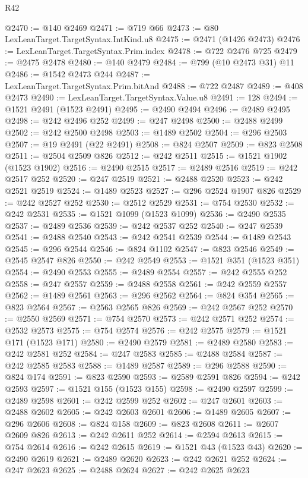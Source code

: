 \begin{lexlean}{R42}
\begin{coremodule}
{@2470 := @140 @2469
@2471 := @719 @66
@2473 := @80 LexLeanTarget.TargetSyntax.IntKind.u8
@2475 := @2471 (@1426 @2473)
@2476 := LexLeanTarget.TargetSyntax.Prim.index
@2478 := @722 @2476 @725
@2479 := @2475 @2478
@2480 := @140 @2479
@2484 := @799 (@10 @2473 @31) @11
@2486 := @1542 @2473 @244
@2487 := LexLeanTarget.TargetSyntax.Prim.bitAnd
@2488 := @722 @2487
@2489 := @408 @2473
@2490 := LexLeanTarget.TargetSyntax.Value.u8
@2491 := 128
@2494 := @1521 @2491 (@1523 @2491)
@2495 := @2490 @2494
@2496 := @2489 @2495
@2498 := @242 @2496 @252
@2499 := @247 @2498
@2500 := @2488 @2499
@2502 := @242 @2500 @2498
@2503 := @1489 @2502
@2504 := @296 @2503
@2507 := @19 @2491 (@22 @2491)
@2508 := @824 @2507
@2509 := @823 @2508
@2511 := @2504 @2509 @826
@2512 := @242 @2511
@2515 := @1521 @1902 (@1523 @1902)
@2516 := @2490 @2515
@2517 := @2489 @2516
@2519 := @242 @2517 @252
@2520 := @247 @2519
@2521 := @2488 @2520
@2523 := @242 @2521 @2519
@2524 := @1489 @2523
@2527 := @296 @2524 @1907 @826
@2529 := @242 @2527 @252
@2530 := @2512 @2529
@2531 := @754 @2530
@2532 := @242 @2531
@2535 := @1521 @1099 (@1523 @1099)
@2536 := @2490 @2535
@2537 := @2489 @2536
@2539 := @242 @2537 @252
@2540 := @247 @2539
@2541 := @2488 @2540
@2543 := @242 @2541 @2539
@2544 := @1489 @2543
@2545 := @296 @2544
@2546 := @824 @1102
@2547 := @823 @2546
@2549 := @2545 @2547 @826
@2550 := @242 @2549
@2553 := @1521 @351 (@1523 @351)
@2554 := @2490 @2553
@2555 := @2489 @2554
@2557 := @242 @2555 @252
@2558 := @247 @2557
@2559 := @2488 @2558
@2561 := @242 @2559 @2557
@2562 := @1489 @2561
@2563 := @296 @2562
@2564 := @824 @354
@2565 := @823 @2564
@2567 := @2563 @2565 @826
@2569 := @242 @2567 @252
@2570 := @2550 @2569
@2571 := @754 @2570
@2573 := @242 @2571 @252
@2574 := @2532 @2573
@2575 := @754 @2574
@2576 := @242 @2575
@2579 := @1521 @171 (@1523 @171)
@2580 := @2490 @2579
@2581 := @2489 @2580
@2583 := @242 @2581 @252
@2584 := @247 @2583
@2585 := @2488 @2584
@2587 := @242 @2585 @2583
@2588 := @1489 @2587
@2589 := @296 @2588
@2590 := @824 @174
@2591 := @823 @2590
@2593 := @2589 @2591 @826
@2594 := @242 @2593
@2597 := @1521 @155 (@1523 @155)
@2598 := @2490 @2597
@2599 := @2489 @2598
@2601 := @242 @2599 @252
@2602 := @247 @2601
@2603 := @2488 @2602
@2605 := @242 @2603 @2601
@2606 := @1489 @2605
@2607 := @296 @2606
@2608 := @824 @158
@2609 := @823 @2608
@2611 := @2607 @2609 @826
@2613 := @242 @2611 @252
@2614 := @2594 @2613
@2615 := @754 @2614
@2616 := @242 @2615
@2619 := @1521 @43 (@1523 @43)
@2620 := @2490 @2619
@2621 := @2489 @2620
@2623 := @242 @2621 @252
@2624 := @247 @2623
@2625 := @2488 @2624
@2627 := @242 @2625 @2623
}
\end{coremodule}
\end{lexlean}
